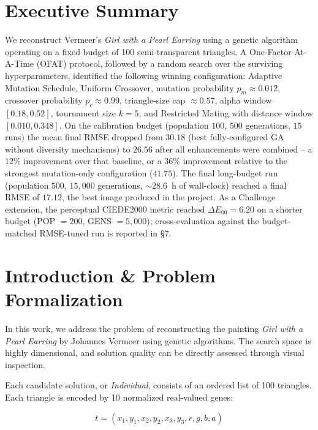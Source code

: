 \documentclass[11pt,a4paper]{article}
\begin{document}
\setcounter{page}{1}


\section{Executive Summary}

We reconstruct Vermeer's \textit{Girl with a Pearl Earring}
using a genetic algorithm operating on a fixed budget of 100 semi-transparent
triangles. A One-Factor-At-A-Time (OFAT) protocol, followed by a random
search over the surviving hyperparameters, identified the following
winning configuration: Adaptive Mutation Schedule, Uniform Crossover,
mutation probability $p_m \approx 0.012$, crossover probability
$p_c \approx 0.99$, triangle-size cap $\approx 0.57$, alpha window
$[0.18, 0.52]$, tournament size $k = 5$, and Restricted Mating with
distance window $[0.010, 0.348]$. On the calibration budget
(population $100$, $500$ generations, $15$ runs) the mean final RMSE
dropped from $30.18$ (best fully-configured GA without diversity mechanisms)
to $26.56$ after all enhancements were combined -- a $12\%$ improvement
over that baseline, or a $36\%$ improvement relative to the strongest
mutation-only configuration ($41.75$). The final long-budget run
(population $500$, $15{,}000$ generations, $\sim\!28.6$~h of wall-clock)
reached a final RMSE of $\mathbf{17.12}$, the best image produced in
the project. As a Challenge extension, the perceptual CIEDE2000 metric
reached $\Delta E_{00} = 6.20$ on a shorter budget (POP $= 200$,
GENS $= 5{,}000$); cross-evaluation against the budget-matched
RMSE-tuned run is reported in \S7.


\section{Introduction \& Problem Formalization}

In this work, we address the problem of reconstructing the painting \textit{Girl with a Pearl Earring} by Johannes Vermeer using genetic algorithms. The search space is highly dimensional, and solution quality can be directly assessed through visual inspection.

Each candidate solution, or \textit{Individual}, consists of an ordered list of 100 triangles. Each triangle is encoded by 10 normalized real-valued genes:

\vspace{-0.6em}
\[
t = (x_{1}, y_{1}, x_{2}, y_{2}, x_{3}, y_{3}, r, g, b, a)
\]
\vspace{-0.8cm}
\end{document}
